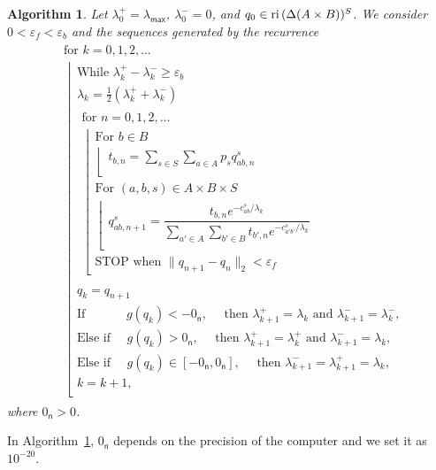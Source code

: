 \documentclass[smallextended,referee,envcountsect,]{svjour3}
\newcommand{\reli}{\ensuremath{\text{\rm ri}\,}}
\newtheorem{algorithm}{\textbf{Algorithm}}
\begin{document}
\begin{algorithm}\label{Heuristic1}
Let ${\lambda}^+_0 = \lambda_{\mathsf{max}}$, ${\lambda}^-_0 = 
0$, and $q_{0}\in\reli (\Delta(A \times B))^S$. We consider 
$0<\varepsilon_f<\varepsilon_b$ and the 
sequences generated by the recurrence
\begin{align}
\label{e:algotseng}
&\begin{array}{l}
\text{for }k=0,1,2,\ldots\\
\left\lfloor
\begin{array}{l}
\text{While } \lambda^+_{k} - \lambda^-_{k} \geq \varepsilon_b\\
\lambda_{k} = \frac12 ({\lambda}^+_{k} + {\lambda}^-_{k})\\
\begin{array}{l}
\text{for }n=0,1,2,\ldots\\
\left\lfloor
\begin{array}{l}
\text{For }b\in B \\
\left\lfloor 
\begin{array}{ll}
{t_{b,n} =\sum\limits_{s\in S}\sum\limits_{a\in 
A}p_sq_{ab,n}^{s}}\\[3pt]
\end{array}
\right. \\
{\text{For }(a,b,s)\in A\times B\times S} \\
\left\lfloor 
\begin{array}{ll}
q_{ab,n+1}^s = \dfrac{t_{b,n} e^{-c_{ab}^s/\lambda_k 
}}{\sum\limits_{a'\in A}\sum\limits_{b'\in B}t_{b'\!,n} 
e^{- c_{a'b'}^s/\lambda_k } }\\[3pt]
\end{array}
\right.\\[5pt]
\text{STOP when } \|q_{n+1} - q_{n}\|_2 < \varepsilon_f
\end{array}
\right.\\
\end{array}\\
q_{k} = q_{n+1}\\
\text{If } \qquad \quad g(q_{k})<-0_{\mathsf{n}},\quad  \text{ then } {\lambda}^+_{k+1} = \lambda_k \text{ and }{\lambda}^-_{k+1} = {\lambda}^-_{k},\\
\text{Else if } \quad g(q_{k})>0_{\mathsf{n}},\quad \text{ then } {\lambda}^+_{k+1} = {\lambda}^+_{k} \text{ and }{\lambda}^-_{k+1} = \lambda_k,\\ 
\text{Else if } \quad g(q_{k})\in[-0_{\mathsf{n}},0_{\mathsf{n}}], \quad \text{ then } \lambda^-_{k+1}=\lambda^+_{k+1}= \lambda_k,\\
k = k+1,\\
\end{array}
\right.
\end{array}
\end{align}
where $0_{\mathsf{n}}>0$.
\end{algorithm}
In Algorithm~\ref{Heuristic1}, $0_{\mathsf{n}}$ depends on the 
precision of the computer and we set it as $10^{-20}$.
\end{document}
